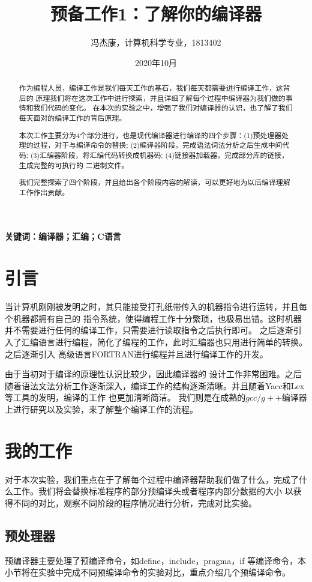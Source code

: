 \documentclass[UTF8]{ctexart}
\title{预备工作1：了解你的编译器}
\author{冯杰康，计算机科学专业，1813402}
\date{2020年10月}
\begin{document}
\maketitle
\begin{abstract}
    作为编程人员，编译工作是我们每天工作的基石，我们每天都需要进行编译工作，这背后的
    原理我们将在这次工作中进行探索，并且详细了解每个过程中编译器为我们做的事情和我们代码的变化。
    在本次的实验之中，增强了我们对编译器的认识，也了解了我们每天面对的编译工作的背后原理。

    本次工作主要分为4个部分进行，也是现代编译器进行编译的四个步骤：(1)预处理器处理的过程，对于与编译命令的替换;
    (2)编译器阶段，完成语法词法分析之后生成中间代码; (3)汇编器阶段，将汇编代码转换成机器码; (4)链接器加载器，完成部分库的链接，生成完整的可执行的
    二进制文件。

    我们完整探索了四个阶段，并且给出各个阶段内容的解读，可以更好地为以后编译理解工作作出贡献。
\end{abstract}
{\bf{关键词：编译器；汇编；C语言}}
\section{引言}
    当计算机刚刚被发明之时，其只能接受打孔纸带传入的机器指令进行运转，并且每个机器都拥有自己的
    指令系统，使得编程工作十分繁琐，也极易出错。这时机器并不需要进行任何的编译工作，只需要进行读取指令之后执行即可。
    之后逐渐引入了汇编语言进行编程，简化了编程的工作，此时汇编器也只用进行简单的转换。之后逐渐引入
    高级语言FORTRAN进行编程\cite{FORTRAN}并且进行编译工作的开发。
    
    由于当初对于编译的原理性认识比较少，因此编译器的
    设计工作非常困难。之后随着语法文法分析工作逐渐深入\cite{Chomsky}，编译工作的结构逐渐清晰。并且随着Yacc和Lex等工具的发明，编译的工作
    也更加清晰简洁。
    我们则是在成熟的$gcc/g++$编译器上进行研究以及实验，来了解整个编译工作的流程。
\section{我的工作}
    对于本次实验，我们重点在于了解每个过程中编译器帮助我们做了什么，完成了什么工作。我们将会替换标准程序的部分预编译头或者程序内部分数据的大小
    以获得不同的对比，观察不同阶段的程序情况进行分析，完成对比实验。
\subsection{预处理器}
预编译器主要处理了预编译命令，如define，include，pragma，if 等编译命令，本小节将在实验中完成不同预编译命令的实验对比，重点介绍几个预编译命令。
\end{document}
